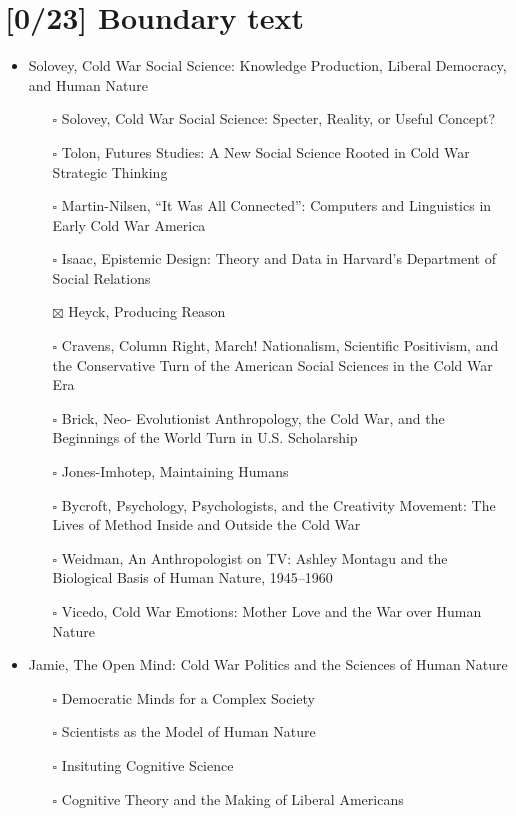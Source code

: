 \documentclass[paper=B6,portrait,twoside=true,twocolumn=false,headinclude=true,footinclude=false,fontsize=12,BCOR=10mm,DIV=calc,pagesize=auto,titlepage=firstiscover,mpinclude=false,headings=normal,headings=twolinechapter,open=right,toc=graduated,chapterprefix=false,numbers=endperiod,parskip=half+]{scrbook}
\theoremstyle{definition}
\begin{document}
\section{[0/23] Boundary text}
\label{sec:org3e06083}
\begin{itemize}
\item\relax [1/11] Solovey, Cold War Social Science: Knowledge Production, Liberal
Democracy, and Human Nature
\begin{itemize}
\item[{$\square$}] Solovey, Cold War Social Science: Specter, Reality, or Useful Concept?
\item[{$\square$}] Tolon, Futures Studies: A New Social Science Rooted in Cold War Strategic Thinking
\item[{$\square$}] Martin-Nilsen, “It Was All Connected”: Computers and Linguistics in Early Cold War America
\item[{$\square$}] Isaac, Epistemic Design: Theory and Data in Harvard’s Department of Social Relations
\item[{$\boxtimes$}] Heyck, Producing Reason
\item[{$\square$}] Cravens, Column Right, March! Nationalism, Scientific Positivism, and the Conservative Turn of the American Social Sciences in the Cold War Era
\item[{$\square$}] Brick, Neo- Evolutionist Anthropology, the Cold War, and the Beginnings of the World Turn in U.S. Scholarship
\item[{$\square$}] Jones-Imhotep, Maintaining Humans
\item[{$\square$}] Bycroft, Psychology, Psychologists, and the Creativity Movement: The Lives of Method Inside and Outside the Cold War
\item[{$\square$}] Weidman, An Anthropologist on TV: Ashley Montagu and the Biological
Basis of Human Nature, 1945–1960
\item[{$\square$}] Vicedo, Cold War Emotions: Mother Love and the War over Human Nature
\end{itemize}
\item\relax [0/5] Jamie, The Open Mind: Cold War Politics and the Sciences of Human
Nature
\begin{itemize}
\item[{$\square$}] Democratic Minds for a Complex Society
\item[{$\square$}] Scientists as the Model of Human Nature
\item[{$\square$}] Insituting Cognitive Science
\item[{$\square$}] Cognitive Theory and the Making of Liberal Americans

\end{itemize}
\end{itemize}
\end{document}
